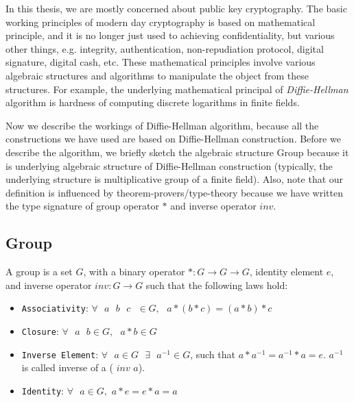     
    
    In this thesis, we are mostly concerned about public key cryptography.
    The basic working principles of modern day cryptography is based on 
    mathematical principle, and  it is no longer just 
    used to achieving confidentiality, but various other things, e.g. integrity,  authentication, non-repudiation 
    protocol, digital signature, digital cash, etc.
    These mathematical principles involve 
    various algebraic structures and algorithms to manipulate the object from these structures.
    For example, the underlying mathematical principal of \textit{Diffie-Hellman}  algorithm 
    is hardness of computing discrete logarithms in finite fields.
    
    
  
    
    Now we  describe the workings of Diffie-Hellman \citep{Diffie:2006:NDC:2263321.2269104}
    algorithm, because all the constructions we have used  are based on Diffie-Hellman construction. 
    Before we describe the algorithm, we briefly sketch the algebraic structure Group because it is underlying algebraic structure of 
    Diffie-Hellman  construction  (typically, the underlying 
    structure is multiplicative group of a finite field). Also, note that our definition is influenced by theorem-provers/type-theory because 
    we have  written the type signature of group operator $*$ and inverse operator $inv$. 
    
    \subsection{Group}
    \label{sec:group}
    A group is a set $G$, with a binary operator $* : G \rightarrow G \rightarrow G$, identity element $e$, and inverse operator $inv : G \rightarrow G$ such 
    that the following laws hold: 
    \begin{itemize}
     \item \texttt{Associativity}: $\forall \text{  } a \text{  } b  \text{  } c \text{  } \in G,  \text{  } a * (b * c) = (a * b) * c$
    \item \texttt{Closure}: $\forall \text{  } a \text{  } b \in G,  \text{  } a * b \in G$
    \item \texttt{Inverse Element}: $\forall \text{  } a \in G \text{  } \exists \text{  } a^{-1} \in G$, such that $a * a^{-1} = a^{-1} * a = e$. $a^{-1}$ is called inverse of a (
     $inv$ $a$).
    \item \texttt{Identity}: $\forall \text{  } a \in G,$  $a * e = e * a  = a$
    \end{itemize}
   
